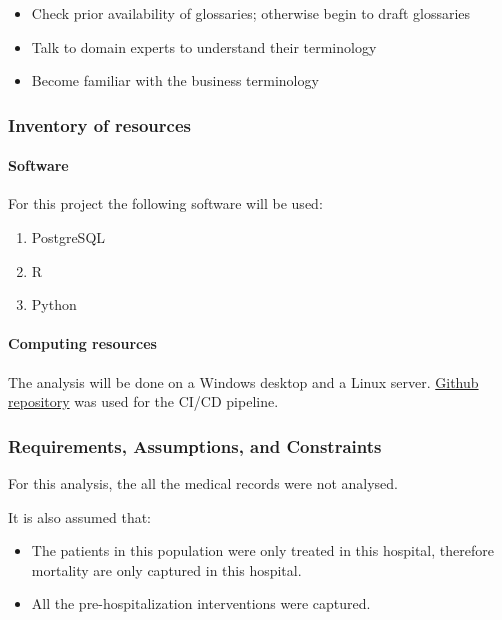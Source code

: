 \documentclass[
]{article}
\providecommand{\tightlist}{%
  \setlength{\itemsep}{0pt}\setlength{\parskip}{0pt}}
\begin{document}
\begin{itemize}
\tightlist
\item
  Check prior availability of glossaries; otherwise begin to draft
  glossaries
\item
  Talk to domain experts to understand their terminology
\item
  Become familiar with the business terminology
\end{itemize}

\hypertarget{inventory-of-resources}{%
\subsubsection{Inventory of resources}\label{inventory-of-resources}}

\hypertarget{software}{%
\paragraph{Software}\label{software}}

For this project the following software will be used:

\begin{enumerate}
\def\labelenumi{\arabic{enumi}.}
\tightlist
\item
  PostgreSQL
\item
  R
\item
  Python
\end{enumerate}

\hypertarget{computing-resources}{%
\paragraph{Computing resources}\label{computing-resources}}

The analysis will be done on a Windows desktop and a Linux server.
\href{https://github.com/em-kagereki/Data-Mining}{Github repository} was
used for the CI/CD pipeline.

\hypertarget{requirements-assumptions-and-constraints}{%
\subsubsection{Requirements, Assumptions, and
Constraints}\label{requirements-assumptions-and-constraints}}

For this analysis, the all the medical records were not analysed.

It is also assumed that:

\begin{itemize}
\item
  The patients in this population were only treated in this hospital,
  therefore mortality are only captured in this hospital.
\item
  All the pre-hospitalization interventions were captured.
\end{itemize}
\end{document}
